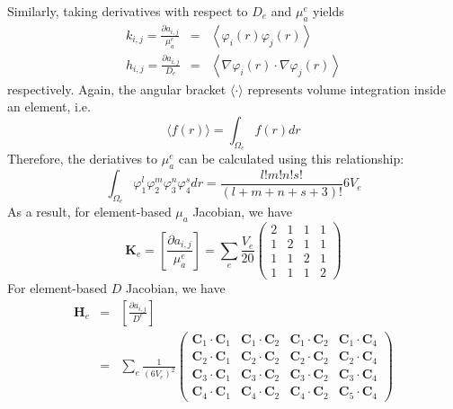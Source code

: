 \documentclass[12pt]{book}               %
\begin{document}
Similarly, taking derivatives with respect to $D_e$ and $\mu_a^{e}$ yields
\begin{eqnarray}
k_{i,j}=\frac{\partial
a_{i,j}}{\mu_a^{e}}&=&\left\langle\varphi_i(r)\varphi_j(r)\right\rangle\\
h_{i,j}=\frac{\partial a_{i,j}}{D_e}&=&\left\langle
\nabla\varphi_i(r)\cdot\nabla\varphi_j(r)\right\rangle
\end{eqnarray}
respectively. Again, the angular bracket $\langle\cdot\rangle$ represents volume integration inside
an element, i.e.
\begin{equation}
\langle f(r) \rangle=\int_{\Omega_e}f(r)dr
\end{equation}
Therefore, the deriatives to $\mu_a^e$ can be calculated using this relationship:
\begin{equation}
\int_{\Omega_e}\varphi_1^l\varphi_2^m\varphi_3^n\varphi_4^sdr=\frac{l!m!n!s!}{(l+m+n+s+3)!}6V_e
\end{equation}
As a result, for element-based $\mu_a$ Jacobian, we have
\begin{equation}
\mathbf{K}_e=\left[\frac{\partial a_{i,j}}{\mu_a^{e}}\right]=\sum_e\frac{V_e}{20}\left(
\begin{array}{llll}
2 & 1 & 1 & 1 \\
1 & 2 & 1 & 1 \\
1 & 1 & 2 & 1 \\
1 & 1 & 1 & 2 
\end{array}
\right)
\end{equation}
For element-based $D$ Jacobian, we have
\begin{eqnarray}\nonumber
\mathbf{H}_e&=&\left[\frac{\partial
a_{i,j}}{D^{e}}\right]\\&=&\sum_e\frac{1}{(6V_e)^2}\left(
\begin{array}{llll}
\mathbf{C}_1\cdot\mathbf{C}_1 & \mathbf{C}_1\cdot\mathbf{C}_2 & \mathbf{C}_1\cdot\mathbf{C}_2 & \mathbf{C}_1\cdot\mathbf{C}_4\\
\mathbf{C}_2\cdot\mathbf{C}_1 & \mathbf{C}_2\cdot\mathbf{C}_2 & \mathbf{C}_2\cdot\mathbf{C}_2 & \mathbf{C}_2\cdot\mathbf{C}_4\\
\mathbf{C}_3\cdot\mathbf{C}_1 & \mathbf{C}_3\cdot\mathbf{C}_2 & \mathbf{C}_3\cdot\mathbf{C}_2 & \mathbf{C}_3\cdot\mathbf{C}_4\\
\mathbf{C}_4\cdot\mathbf{C}_1 & \mathbf{C}_4\cdot\mathbf{C}_2 & \mathbf{C}_4\cdot\mathbf{C}_2 & \mathbf{C}_5\cdot\mathbf{C}_4
\end{array}
\right)
\end{eqnarray}
\end{document}
